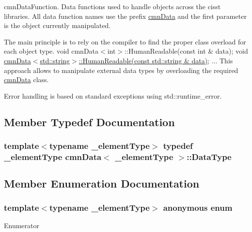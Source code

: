 cmn\+Data\+Function. Data functions used to handle objects across the cisst libraries. All data function names use the prefix \hyperlink{classcmn_data}{cmn\+Data} and the first parameter is the object currently manipulated.

The main principle is to rely on the compiler to find the proper class overload for each object type. {\ttfamily  void cmn\+Data$<$int$>$\+::\+Human\+Readable(const int \& data); void \hyperlink{classcmn_data_3_01std_1_1string_01_4_ab72e4cd237cd5e96082f78de567e7f3d}{cmn\+Data$<$std\+::string$>$\+::\+Human\+Readable(const std\+::string \& data)}; ... } This approach allows to manipulate external data types by overloading the required \hyperlink{classcmn_data}{cmn\+Data} class.

Error handling is based on standard exceptions using std\+::runtime\+\_\+error. 

\subsection{Member Typedef Documentation}
\hypertarget{classcmn_data_a353bd6bb0af651b6301e5e2e34587da2}{}
\subsubsection[{Data\+Type}]{\setlength{\rightskip}{0pt plus 5cm}template$<$typename \+\_\+element\+Type$>$ typedef \+\_\+element\+Type {\bf cmn\+Data}$<$ \+\_\+element\+Type $>$\+::{\bf Data\+Type}}\label{classcmn_data_a353bd6bb0af651b6301e5e2e34587da2}


\subsection{Member Enumeration Documentation}
\hypertarget{classcmn_data_a8e15f7bac4709a448e12083e816d59dd}{}\subsubsection[{anonymous enum}]{\setlength{\rightskip}{0pt plus 5cm}template$<$typename \+\_\+element\+Type$>$ anonymous enum}\label{classcmn_data_a8e15f7bac4709a448e12083e816d59dd}
\begin{Desc}
\item[Enumerator]\par
\begin{description}
\item[{\em 
\hypertarget{classcmn_data_a8e15f7bac4709a448e12083e816d59dda72e7c5ce850db7c34c87a0e5f4456c30}{}I\+S\+\_\+\+S\+P\+E\+C\+I\+A\+L\+I\+Z\+E\+D\label{classcmn_data_a8e15f7bac4709a448e12083e816d59dda72e7c5ce850db7c34c87a0e5f4456c30}
}]\end{description}
\end{Desc}


